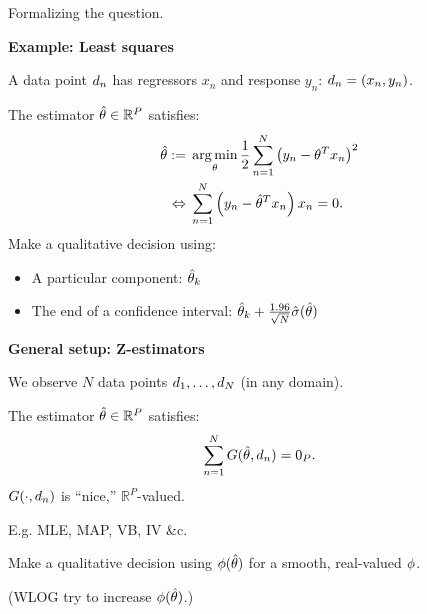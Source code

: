

\begin{frame}[t]{Formalizing the question.}

\begin{minipage}[t]{0.45\textwidth}
\textbf{Example: Least squares}

\pause
\vspace{1em}
A data point $d_n$ has regressors
$x_n$ and response $y_n$: $d_n = (x_n, y_n)$.

\pause
\vspace{1em}
The estimator $\hat{\theta} \in \mathbb{R}^P$ satisfies:
%
\begin{align*}
%
\thetahat :={}&
    \argmin_{\theta} \frac{1}{2} \sumn \left(y_n - \theta^T x_n \right)^{2} \\
\Leftrightarrow{}& \sumn \left(y_n - \thetahat^T x_n \right) x_n = 0.
%
\end{align*}
%
\pause
Make a qualitative decision using:\vspace{-1.5em}
\begin{itemize}
\item A particular component: $\hat{\theta}_k$
\item The end of a confidence interval:
    $\hat{\theta}_k + \frac{1.96}{\sqrt{N}} \hat\sigma(\hat{\theta})$
\end{itemize}
%
\end{minipage}
%
\pause
\hfill\vline\hfill
%
\begin{minipage}[t]{0.45\textwidth}
\textbf{General setup: Z-estimators}

\pause
\vspace{1em}
We observe $N$ data points $d_{1}, \ldots, d_{N}$
(in any domain).

\pause
\vspace{1em}
The estimator $\hat{\theta} \in \mathbb{R}^P$ satisfies:
%
\begin{align*}
%
\sumn
G(\thetahat, \d_{n}) =  \zP.
%
\end{align*}
%
$G(\cdot, d_{n})$ is ``nice,'' $\mathbb{R}^P$-valued.

E.g. MLE, MAP, VB, IV \&c.

\pause
\vspace{1em}
Make a qualitative decision using $\phi(\hat{\theta})$
for a smooth, real-valued $\phi$.

\vspace{1em}
(WLOG try to increase $\phi(\hat{\theta})$.)
%
\end{minipage}

\end{frame}






